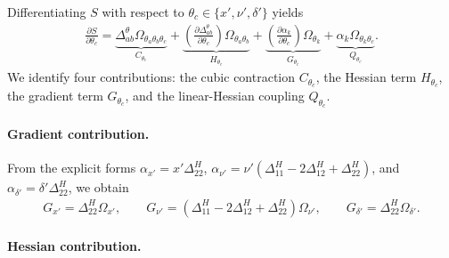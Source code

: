 \documentclass{article}
\begin{document}
%
Differentiating $S$ with respect to $\theta_c \in \{x', \nu', \delta'\}$ yields
%
\begin{align}
  \frac{\partial S}{\partial \theta_c}
  = \underbrace{\Delta^\theta_{ab} \Omega_{\theta_a \theta_b \theta_c}}_{C_{\theta_c}}
  + \underbrace{\left(\frac{\partial \Delta^\theta_{ab}}{\partial \theta_c}\right) \Omega_{\theta_a \theta_b}}_{H_{\theta_c}}
  + \underbrace{\left(\frac{\partial \alpha_k}{\partial \theta_c}\right) \Omega_{\theta_k}}_{G_{\theta_c}}
  + \underbrace{\alpha_k \Omega_{\theta_k \theta_c}}_{Q_{\theta_c}}.
\end{align}
%
We identify four contributions: the cubic contraction $C_{\theta_c}$, the Hessian term $H_{\theta_c}$, the gradient term $G_{\theta_c}$, and the linear-Hessian coupling $Q_{\theta_c}$.

\paragraph{Gradient contribution.}

From the explicit forms $\alpha_{x'} = x' \Delta^H_{22}$, $\alpha_{\nu'} = \nu' (\Delta^H_{11} - 2\Delta^H_{12} + \Delta^H_{22})$, and $\alpha_{\delta'} = \delta' \Delta^H_{22}$, we obtain
%
\begin{align}
  G_{x'}      = \Delta^H_{22} \Omega_{x'}, \qquad
  G_{\nu'}    = (\Delta^H_{11} - 2\Delta^H_{12} + \Delta^H_{22}) \Omega_{\nu'}, \qquad
  G_{\delta'} = \Delta^H_{22} \Omega_{\delta'}.
\end{align}

\paragraph{Hessian contribution.}
\end{document}
